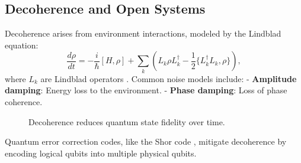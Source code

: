 \subsection{Decoherence and Open Systems}
\label{subsec:decoherence}

Decoherence arises from environment interactions, modeled by the Lindblad equation:
\[
\frac{d\rho}{dt} = -\frac{i}{\hbar}[H, \rho] + \sum_k \left( L_k \rho L_k^\dagger - \frac{1}{2}\{L_k^\dagger L_k, \rho\} \right),
\]
where $L_k$ are Lindblad operators \cite{breuer2002theory}. Common noise models include:
- \textbf{Amplitude damping}: Energy loss to the environment.
- \textbf{Phase damping}: Loss of phase coherence.

\begin{figure}[h]
\centering
{}
\caption{Decoherence reduces quantum state fidelity over time.}
\label{fig:decoherence}
\end{figure}

Quantum error correction codes, like the Shor code \cite{shor1995scheme}, mitigate decoherence by encoding logical qubits into multiple physical qubits.